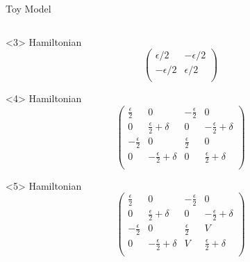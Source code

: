 \documentclass[pdf]{beamer}
\begin{document}
\begin{frame}{Toy Model}
\begin{columns}
\begin{column}[]{0.5\textwidth}
                    \begin{onlyenv}<3>
                        \centering
                        Hamiltonian
                        \begin{equation*}
                        \begin{pmatrix}
                            \epsilon/2&-\epsilon/2\\
                            -\epsilon/2&\epsilon/2\\
                        \end{pmatrix}
                        \end{equation*}
                    \end{onlyenv}
                    \begin{onlyenv}<4>
                        \centering
                        Hamiltonian
                        \begin{equation*}
                        \begin{pmatrix}
                            \frac{\epsilon}{2}&0&-\frac{\epsilon}{2}&0\\
                            0&\frac{\epsilon}{2}+\delta&0&-\frac{\epsilon}{2}+\delta\\
                            -\frac{\epsilon}{2}&0&\frac{\epsilon}{2}&0\\
                            0&-\frac{\epsilon}{2}+\delta&0&\frac{\epsilon}{2}+\delta\\
                        \end{pmatrix}
                        \end{equation*}
                    \end{onlyenv}
                    \begin{onlyenv}<5>
                        \centering
                        Hamiltonian
                        \begin{equation*}
                        \begin{pmatrix}
                            \frac{\epsilon}{2}&0&-\frac{\epsilon}{2}&0\\
                            0&\frac{\epsilon}{2}+\delta&0&-\frac{\epsilon}{2}+\delta\\
                            -\frac{\epsilon}{2}&0&\frac{\epsilon}{2}&V\\
                            0&-\frac{\epsilon}{2}+\delta&V&\frac{\epsilon}{2}+\delta\\
                        \end{pmatrix}
                        \end{equation*}
                    \end{onlyenv}
                \end{column}
                \end{columns}
            \end{frame}
\end{document}

